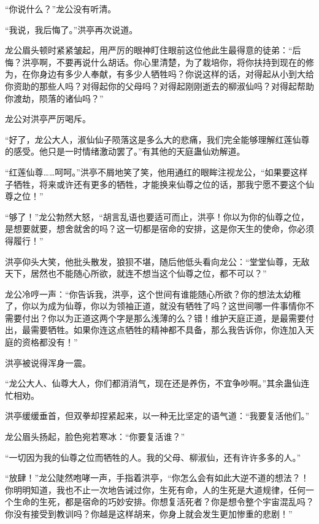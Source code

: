 
\begin{this_body}



“你说什么？”龙公没有听清。

“我说，我后悔了。”洪亭再次说道。

龙公眉头顿时紧紧皱起，用严厉的眼神盯住眼前这位他此生最得意的徒弟：“后悔？洪亭啊，不要再说什么胡话。你心里清楚，为了栽培你，将你扶持到现在的修为，在你身边有多少人奉献，有多少人牺牲吗？你说这样的话，对得起从小到大给你资助的那些人吗？对得起你的父母吗？对得起刚刚逝去的柳淑仙吗？对得起帮助你渡劫，陨落的诸仙吗？”

龙公对洪亭严厉喝斥。

“好了，龙公大人，淑仙仙子陨落这是多么大的悲痛，我们完全能够理解红莲仙尊的感受。他只是一时情绪激动罢了。”有其他的天庭蛊仙劝解道。

“红莲仙尊……呵呵。”洪亭不屑地笑了笑，他用通红的眼眸注视龙公，“如果要这样子牺牲，将来或许还有更多的牺牲，才能换来仙尊之位的话，那我宁愿不要这个仙尊之位！”

“够了！”龙公勃然大怒，“胡言乱语也要适可而止，洪亭！你以为你的仙尊之位，是想要就要，想舍就舍的吗？这一切都是宿命的安排，这是你天生的使命，你必须得履行！”

洪亭仰头大笑，他批头散发，狼狈不堪，随后他低头看向龙公：“堂堂仙尊，无敌天下，居然也不能随心所欲，就连不想当这个仙尊之位，都不可以？”

龙公冷哼一声：“你告诉我，洪亭，这个世间有谁能随心所欲？你的想法太幼稚了，你以为成为仙尊，你以为领袖正道，就没有牺牲了吗？这世间哪一件事情你不需要付出？你以为正道这两个字是那么浅薄的么？错！维护天庭正道，是最需要付出，最需要牺牲。如果你连这点牺牲的精神都不具备，那么我告诉你，你连加入天庭的资格都没有！”

洪亭被说得浑身一震。

“龙公大人、仙尊大人，你们都消消气，现在还是养伤，不宜争吵啊。”其余蛊仙连忙相劝。

洪亭缓缓垂首，但双拳却捏紧起来，以一种无比坚定的语气道：“我要复活他们。”

龙公眉头扬起，脸色宛若寒冰：“你要复活谁？”

“一切因为我的仙尊之位而牺牲的人。我的父母、柳淑仙，还有许许多多的人。”

“放肆！”龙公陡然咆哮一声，手指着洪亭，“你怎么会有如此大逆不道的想法？！你明明知道，我也不止一次地告诫过你，生死有命，人的生死是大道规律，任何一个生命的生死，都是宿命的巧妙安排。你想复活死者？你是想令整个宇宙混乱吗？你没有接受到教训吗？你越是这样胡来，你身上就会发生更加惨重的悲剧！”


\end{this_body}
